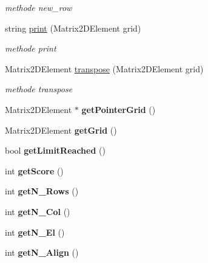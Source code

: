 \begin{DoxyCompactItemize}
\begin{DoxyCompactList}\small\item\em methode new\-\_\-row \end{DoxyCompactList}\item 
string \hyperlink{classGrid_ae663c90ddf65ccbe3b9c2e87544b3baf}{print} (Matrix2\-D\-Element grid)
\begin{DoxyCompactList}\small\item\em methode print \end{DoxyCompactList}\item 
Matrix2\-D\-Element \hyperlink{classGrid_a152f8fb7d4332be47178e3e53ee8bb5f}{transpose} (Matrix2\-D\-Element grid)
\begin{DoxyCompactList}\small\item\em methode transpose \end{DoxyCompactList}\item 
\hypertarget{classGrid_a7471bb18c4ad96aaac787564a663bd76}{Matrix2\-D\-Element $\ast$ {\bfseries get\-Pointer\-Grid} ()}\label{classGrid_a7471bb18c4ad96aaac787564a663bd76}

\item 
\hypertarget{classGrid_ac4e84b005d9840fd5d20d03714ac8b1d}{Matrix2\-D\-Element {\bfseries get\-Grid} ()}\label{classGrid_ac4e84b005d9840fd5d20d03714ac8b1d}

\item 
\hypertarget{classGrid_a0c1fe427b5dbec4b6c17ae1cfb397184}{bool {\bfseries get\-Limit\-Reached} ()}\label{classGrid_a0c1fe427b5dbec4b6c17ae1cfb397184}

\item 
\hypertarget{classGrid_a645dc308d966d7a75134ccaf8c055302}{int {\bfseries get\-Score} ()}\label{classGrid_a645dc308d966d7a75134ccaf8c055302}

\item 
\hypertarget{classGrid_a2c87c59b681d95e5a8c6bbebac74163e}{int {\bfseries get\-N\-\_\-\-Rows} ()}\label{classGrid_a2c87c59b681d95e5a8c6bbebac74163e}

\item 
\hypertarget{classGrid_acb7d4688bc45c32b31d72ec0c9f1c99b}{int {\bfseries get\-N\-\_\-\-Col} ()}\label{classGrid_acb7d4688bc45c32b31d72ec0c9f1c99b}

\item 
\hypertarget{classGrid_a6559b05475aaea06ec00d7641f8d4ee2}{int {\bfseries get\-N\-\_\-\-El} ()}\label{classGrid_a6559b05475aaea06ec00d7641f8d4ee2}

\item 
\hypertarget{classGrid_a1a9ed507ef04c46dd0663a0fbcd85c6f}{int {\bfseries get\-N\-\_\-\-Align} ()}\label{classGrid_a1a9ed507ef04c46dd0663a0fbcd85c6f}


\end{DoxyCompactItemize}
